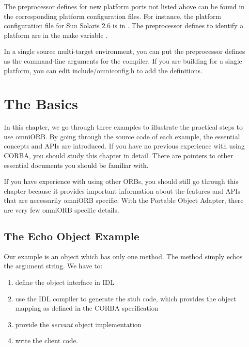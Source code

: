 \documentclass[11pt,oneside,a4paper]{book}
\newcommand{\term}[1]{\textit{#1}}
\begin{document}
The preprocessor defines for new platform ports not listed above can
be found in the corresponding platform configuration files. For
instance, the platform configuration file for Sun Solaris 2.6 is in
. The preprocessor defines to
identify a platform are in the make variable
.

In a single source multi-target environment, you can put the
preprocessor defines as the command-line arguments for the compiler.
If you are building for a single platform, you can edit
include/omniconfig.h to add the definitions.



\chapter{The Basics}
\label{chap:basic}

In this chapter, we go through three examples to illustrate the
practical steps to use omniORB. By going through the source code of
each example, the essential concepts and APIs are introduced. If you
have no previous experience with using CORBA, you should study this
chapter in detail. There are pointers to other essential documents you
should be familiar with.

If you have experience with using other ORBs, you should still go
through this chapter because it provides important information about
the features and APIs that are necessarily omniORB specific. With the
Portable Object Adapter, there are very few omniORB specific details.


\section{The Echo Object Example}

Our example is an object which has only one method. The method simply
echos the argument string. We have to:

\begin{enumerate}

\item define the object interface in IDL
\item use the IDL compiler to generate the stub code, which provides
  the object mapping as defined in the CORBA specification
\item provide the \term{servant} object implementation
\item write the client code.

\end{enumerate}
\end{document}
